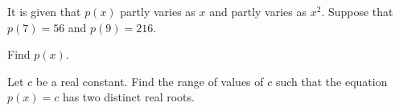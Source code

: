 
It is given that $p(x)$ partly varies as $x$ and partly varies as $x^2$. Suppose that $p(7)=56$ and $p(9)=216$.

\begin{enumx}[label=(\alph*)]
	\item Find $p(x)$.
    \item Let $c$ be a real constant. Find the range of values of $c$ such that the equation $p(x)=c$ has two distinct real roots.

\end{enumx}




